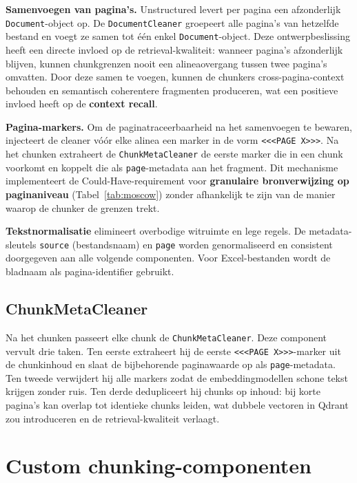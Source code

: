 \textbf{Samenvoegen van pagina's.} Unstructured levert per pagina een afzonderlijk \texttt{Document}-object op. De \texttt{DocumentCleaner} groepeert alle pagina's van hetzelfde bestand en voegt ze samen tot één enkel \texttt{Document}-object. Deze ontwerpbeslissing heeft een directe invloed op de retrieval-kwaliteit: wanneer pagina's afzonderlijk blijven, kunnen chunkgrenzen nooit een alineaovergang tussen twee pagina's omvatten. Door deze samen te voegen, kunnen de chunkers cross-pagina-context behouden en semantisch coherentere fragmenten produceren, wat een positieve invloed heeft op de \textbf{context recall}.

\textbf{Pagina-markers.} Om de paginatraceerbaarheid na het samenvoegen te bewaren, injecteert de cleaner vóór elke alinea een marker in de vorm \texttt{<<<PAGE X>>>}. Na het chunken extraheert de \texttt{ChunkMetaCleaner} de eerste marker die in een chunk voorkomt en koppelt die als \texttt{page}-metadata aan het fragment. Dit mechanisme implementeert de Could-Have-requirement voor \textbf{granulaire bronverwijzing op paginaniveau} (Tabel~\ref{tab:moscow}) zonder afhankelijk te zijn van de manier waarop de chunker de grenzen trekt.

\textbf{Tekstnormalisatie} elimineert overbodige witruimte en lege regels. De metadata-sleutels \texttt{source} (bestandsnaam) en \texttt{page} worden genormaliseerd en consistent doorgegeven aan alle volgende componenten. Voor Excel-bestanden wordt de bladnaam als pagina-identifier gebruikt.

\subsection{ChunkMetaCleaner}
\label{subsec:chunkmetacleaner}

Na het chunken passeert elke chunk de \texttt{ChunkMetaCleaner}. Deze component vervult drie taken. Ten eerste extraheert hij de eerste \texttt{<<<PAGE X>>>}-marker uit de chunkinhoud en slaat de bijbehorende paginawaarde op als \texttt{page}-metadata. Ten tweede verwijdert hij alle markers zodat de embeddingmodellen schone tekst krijgen zonder ruis. Ten derde dedupliceert hij chunks op inhoud: bij korte pagina's kan overlap tot identieke chunks leiden, wat dubbele vectoren in Qdrant zou introduceren en de retrieval-kwaliteit verlaagt.

\section{Custom chunking-componenten}
\label{sec:chunkers}

